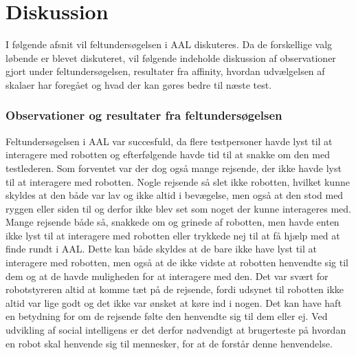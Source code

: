 \chapter{Diskussion}
\label{ParametreDiskussion}
%
I følgende afsnit vil feltundersøgelsen i AAL diskuteres. Da de forskellige valg løbende er blevet diskuteret, vil følgende indeholde diskussion af observationer gjort under feltundersøgelsen, resultater fra affinity, hvordan udvælgelsen af skalaer har foregået og hvad der kan gøres bedre til næste test.\blankline
%
\subsection{Observationer og resultater fra feltundersøgelsen}
\label{DiskussionerObservationer}
%
Feltundersøgelsen i AAL var succesfuld, da flere testpersoner havde lyst til at interagere med robotten og efterfølgende havde tid til at snakke om den med testlederen. Som forventet var der dog også mange rejsende, der ikke havde lyst til at interagere med robotten. Nogle rejsende så slet ikke robotten, hvilket kunne skyldes at den både var lav og ikke altid i bevægelse, men også at den stod med ryggen eller siden til og derfor ikke blev set som noget der kunne interageres med. Mange rejsende både så, snakkede om og grinede af robotten, men havde enten ikke lyst til at interagere med robotten eller trykkede nej til at få hjælp med at finde rundt i AAL. Dette kan både skyldes at de bare ikke have lyst til at interagere med robotten, men også at de ikke vidste at robotten henvendte sig til dem og at de havde muligheden for at interagere med den. Det var svært for robotstyreren altid at komme tæt på de rejsende, fordi udsynet til robotten ikke altid var lige godt og det ikke var ønsket at køre ind i nogen. Det kan have haft en betydning for om de rejsende følte den henvendte sig til dem eller ej. Ved udvikling af social intelligens er det derfor nødvendigt at brugerteste på hvordan en robot skal henvende sig til mennesker, for at de forstår denne henvendelse.

